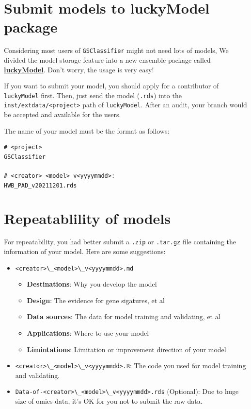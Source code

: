 \documentclass[
  12pt,
]{book}
\newcommand{\passthrough}[1]{#1}
\begin{document}
\hypertarget{submit-models-to-luckymodel-package}{%
\section{Submit models to luckyModel package}\label{submit-models-to-luckymodel-package}}

Considering most users of \passthrough{\lstinline!GSClassifier!} might not need lots of models, We divided the model storage feature into a new ensemble package called \href{https://github.com/huangwb8/luckyModel}{\textbf{luckyModel}}. Don't worry, the usage is very easy!

If you want to submit your model, you should apply for a contributor of \passthrough{\lstinline!luckyModel!} first. Then, just send the model (\passthrough{\lstinline!.rds!}) into the \passthrough{\lstinline!inst/extdata/<project>!} path of \passthrough{\lstinline!luckyModel!}. After an audit, your branch would be accepted and available for the users.

The name of your model must be the format as follows:

\begin{lstlisting}
# <project>
GSClassifier

# <creator>_<model>_v<yyyymmdd>:
HWB_PAD_v20211201.rds
\end{lstlisting}

\hypertarget{repeatablility-of-models}{%
\section{Repeatablility of models}\label{repeatablility-of-models}}

For repeatability, you had better submit a \passthrough{\lstinline!.zip!} or \passthrough{\lstinline!.tar.gz!} file containing the information of your model. Here are some suggestions:

\begin{itemize}
\item
  \passthrough{\lstinline!<creator>\_<model>\_v<yyyymmdd>.md!}

  \begin{itemize}
  \item
    \textbf{Destinations}: Why you develop the model
  \item
    \textbf{Design}: The evidence for gene sigatures, et al
  \item
    \textbf{Data sources}: The data for model training and validating, et al
  \item
    \textbf{Applications}: Where to use your model
  \item
    \textbf{Limintations}: Limitation or improvement direction of your model
  \end{itemize}
\item
  \passthrough{\lstinline!<creator>\_<model>\_v<yyyymmdd>.R!}: The code you used for model training and validating.
\item
  \passthrough{\lstinline!Data-of-<creator>\_<model>\_v<yyyymmdd>.rds!} (Optional): Due to huge size of omics data, it's OK for you not to submit the raw data.
\end{itemize}
\end{document}
